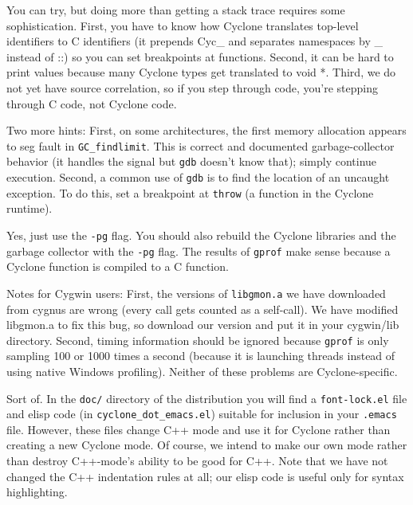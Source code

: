 
You can try, but doing more than getting a stack trace requires some
sophistication.  First, you have to know how Cyclone translates
top-level identifiers to C identifiers (it prepends Cyc_ and separates
namespaces by _ instead of ::) so you can set breakpoints at
functions.  Second, it can be hard to print values because many
Cyclone types get translated to void *.  Third, we do not yet have
source correlation, so if you step through code, you're stepping
through C code, not Cyclone code.

Two more hints: First, on some architectures, the first memory
allocation appears to seg fault in \texttt{GC_findlimit}.  This is
correct and documented garbage-collector behavior (it handles the
signal but \texttt{gdb} doesn't know that); simply continue execution.
Second, a common use of \texttt{gdb} is to find the location of an
uncaught exception.  To do this, set a breakpoint at \texttt{throw} (a
function in the Cyclone runtime).


Yes, just use the \texttt{-pg} flag.  You should also rebuild the
Cyclone libraries and the garbage collector with the \texttt{-pg}
flag.  The results of \texttt{gprof} make sense because a Cyclone
function is compiled to a C function.

Notes for Cygwin users: First, the versions of \texttt{libgmon.a} we
have downloaded from cygnus are wrong (every call gets counted as a
self-call).  We have modified libgmon.a to fix this bug, so download
our version and put it in your cygwin/lib directory.  Second, timing
information should be ignored because \texttt{gprof} is only sampling
100 or 1000 times a second (because it is launching threads instead of
using native Windows profiling).  Neither of these problems are
Cyclone-specific.


Sort of.  In the \texttt{doc/} directory of the distribution you will
find a \texttt{font-lock.el} file and elisp code (in
\texttt{cyclone_dot_emacs.el}) suitable for inclusion in your
\texttt{.emacs} file.  However, these files change C++ mode and use it
for Cyclone rather than creating a new Cyclone mode.  Of course, we
intend to make our own mode rather than destroy C++-mode's ability to
be good for C++.  Note that we have not changed the C++ indentation
rules at all; our elisp code is useful only for syntax highlighting.

